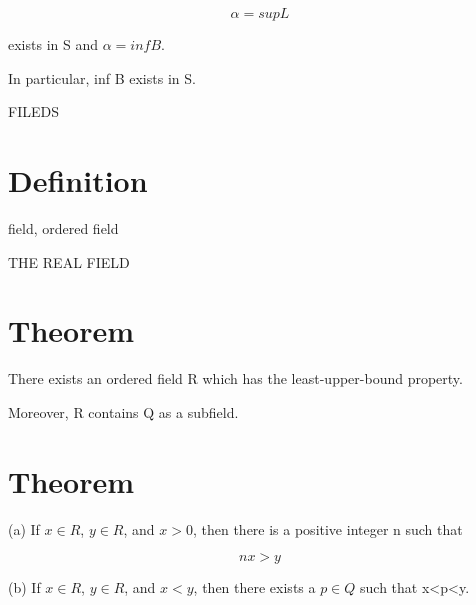 \documentclass{article}
\theoremstyle{definition}
\theoremstyle{remark}
\begin{document}
\[\alpha=sup L\]

exists in S and $\alpha= infB$.

In particular, inf B exists in S.

\hspace{\fill}

FILEDS

\section*{Definition}

field, ordered field

\hspace{\fill}

THE REAL FIELD

\section*{Theorem}

There exists an ordered field R which has the least-upper-bound property.

Moreover, R contains Q as a subfield.

\section*{Theorem}\noindent

(a) If $x\in R$, $y\in R$, and $x>0$, then there is a positive integer n such that

\[
nx>y
\]

(b) If $x\in R$, $y\in R$, and $x<y$, then there exists a $p\in Q$ such that x<p<y.





	
\end{document}

